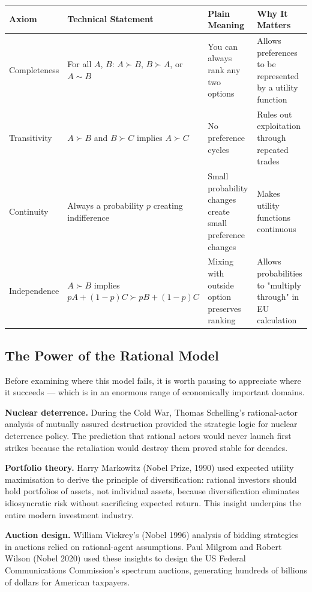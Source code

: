 \documentclass[12pt, letterpaper]{article}
\begin{document}
\begin{table}[H]
\centering
\small
\begin{tabularx}{\linewidth}{lXXX}
\toprule
Axiom & Technical Statement & Plain Meaning & Why It Matters \\
\midrule
Completeness & For all $A$, $B$: $A \succ B$, $B \succ A$, or $A \sim B$ & You can always rank any two options & Allows preferences to be represented by a utility function \\
Transitivity & $A \succ B$ and $B \succ C$ implies $A \succ C$ & No preference cycles & Rules out exploitation through repeated trades \\
Continuity & Always a probability $p$ creating indifference & Small probability changes create small preference changes & Makes utility functions continuous \\
Independence & $A \succ B$ implies $pA+(1-p)C \succ pB+(1-p)C$ & Mixing with outside option preserves ranking & Allows probabilities to "multiply through" in EU calculation \\
\bottomrule
\end{tabularx}
\end{table}


\medskip


\subsection{The Power of the Rational Model}


Before examining where this model fails, it is worth pausing to appreciate where it succeeds --- which is in an enormous range of economically important domains.

\textbf{Nuclear deterrence.} During the Cold War, Thomas Schelling's rational-actor analysis of mutually assured destruction provided the strategic logic for nuclear deterrence policy. The prediction that rational actors would never launch first strikes because the retaliation would destroy them proved stable for decades.

\textbf{Portfolio theory.} Harry Markowitz (Nobel Prize, 1990) used expected utility maximisation to derive the principle of diversification: rational investors should hold portfolios of assets, not individual assets, because diversification eliminates idiosyncratic risk without sacrificing expected return. This insight underpins the entire modern investment industry.

\textbf{Auction design.} William Vickrey's (Nobel 1996) analysis of bidding strategies in auctions relied on rational-agent assumptions. Paul Milgrom and Robert Wilson (Nobel 2020) used these insights to design the US Federal Communications Commission's spectrum auctions, generating hundreds of billions of dollars for American taxpayers.
\end{document}
